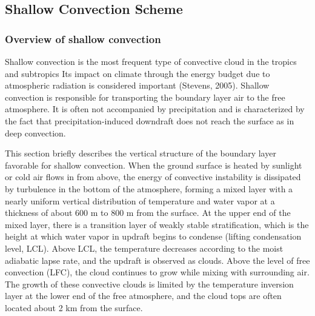 

\subsection{Shallow Convection Scheme}\label{shallow-convection-scheme}

\subsubsection{Overview of shallow convection}\label{overview-of-shallow-convection}
Shallow convection is the most frequent type of convective cloud in the tropics and subtropics Its impact on climate through the energy budget due to atmospheric radiation is considered important (Stevens, 2005).
Shallow convection is responsible for transporting the boundary layer air to the free atmosphere. It is often not accompanied by precipitation and is characterized by the fact that precipitation-induced downdraft does not reach the surface as in deep convection.

This section briefly describes the vertical structure of the boundary layer favorable for shallow convection.
When the ground surface is heated by sunlight or cold air flows in from above, the energy of convective instability is dissipated by turbulence in the bottom of the atmosphere, forming a mixed layer with a nearly uniform vertical distribution of 
temperature and water vapor at a thickness of about 600 m to 800 m from the surface.
At the upper end of the mixed layer, there is a transition layer of weakly stable stratification, which is the height at which water vapor in updraft begins to condense (lifting condensation level, LCL).
Above LCL, the temperature decreases according to the moist adiabatic lapse rate, and the updraft is observed as clouds. Above the level of free convection (LFC), the cloud continues to grow while mixing with surrounding air. 
The growth of these convective clouds is limited by the temperature inversion layer at the lower end of the free atmosphere, and the cloud tops are often located about 2 km from the surface.

